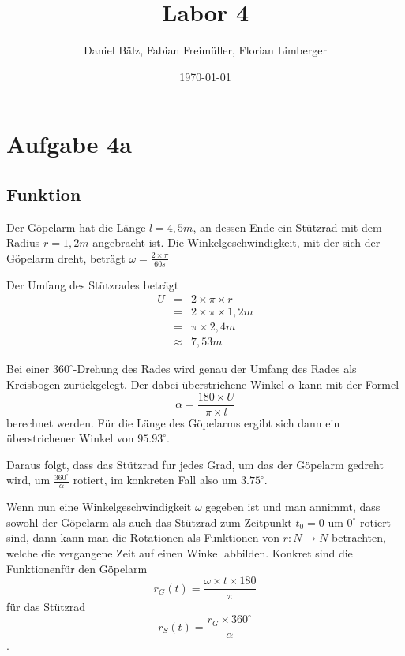 \documentclass[a4paper,12pt]{article}
\begin{document}
\title{Labor 4}
\author{Daniel Bälz, Fabian Freimüller, Florian Limberger}
\date{\today}

\maketitle

\section{Aufgabe 4a}
\subsection{Funktion}

Der Göpelarm hat die Länge $l=4,5m$, an dessen Ende ein Stützrad mit dem Radius
$r=1,2m$ angebracht ist. Die Winkelgeschwindigkeit, mit der sich der Göpelarm
dreht, beträgt $\omega = \frac{2 \times \pi}{60s}$

Der Umfang des Stützrades beträgt
\begin{eqnarray}
U & = & 2 \times \pi \times r \nonumber \\
& = & 2 \times \pi \times 1,2m \nonumber \\
& = & \pi \times 2,4m \nonumber \\
& \approx & 7,53m
\end{eqnarray}

Bei einer $360^{\circ}$-Drehung des Rades wird genau der Umfang des Rades als
Kreisbogen zurückgelegt. Der dabei überstrichene Winkel $\alpha$ kann mit der
Formel
\begin{equation}
\alpha = \frac{180 \times U}{\pi \times l}
\end{equation}
berechnet werden. Für die Länge des Göpelarms ergibt sich dann ein
überstrichener Winkel von $95.93^{\circ}$.

Daraus folgt, dass das Stützrad fur jedes Grad, um das der Göpelarm gedreht
wird, um $\frac{360^{\circ}}{\alpha}$ rotiert, im konkreten Fall also um
$3.75^{\circ}$.

Wenn nun eine Winkelgeschwindigkeit $\omega$ gegeben ist und man annimmt, dass
sowohl der Göpelarm als auch das Stützrad zum Zeitpunkt $t_{0} = 0$ um
$0^{\circ}$ rotiert sind, dann kann man die Rotationen als Funktionen von
$r: N \rightarrow N$ betrachten, welche die vergangene Zeit auf einen Winkel
abbilden. Konkret sind die Funktionenfür den Göpelarm
\begin{equation}
r_{G}(t) = \frac{\omega \times t \times 180}{\pi}
\end{equation}
für das Stützrad
\begin{equation}
r_{S}(t) = \frac{r_{G} \times 360^{\circ}}{\alpha}
\end{equation}.
\end{document}
